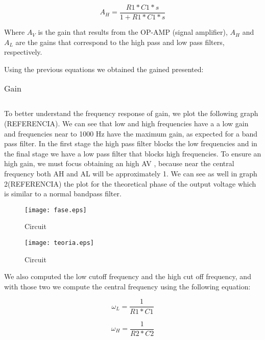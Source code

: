 \begin{equation}
A_{H}=  \frac{R1*C1*s}{1+R1*C1*s}
\end{equation}

Where $A_V$ is the gain that results from the OP-AMP (signal amplifier), $A_H$ and $A_L$ are the gains that correspond to the high pass and low pass filters, respectively.

Using the previous equations we obtained the gained presented:

\begin{table}[H]
\centering
\begin{tabularx}{0.6\textwidth} {
  | >{\raggedright\arraybackslash}X
  | >{\raggedleft\arraybackslash}X | }
 \hline

\end{tabularx}
\caption{Gain}
\end{table}

To better understand the frequency response of gain, we plot the following graph (REFERENCIA).  We can see that low and high frequencies have a a low gain and frequencies near to 1000 Hz have the maximum gain, as expected for a band pass filter.
In the first stage the high pass filter blocks the low frequencies and in the final stage we have a low pass filter that blocks high frequencies. To ensure an high gain, we must focus obtaining an high AV , because near the central frequency both AH and AL will be approximately 1. We can see as well in graph 2(REFERENCIA) the plot for the theoretical phase of the output voltage which is similar to a normal bandpass filter.

\begin{figure}[H] \centering
\texttt{[image: fase.eps]}
\caption{Circuit}
\label{fig:circ}
\end{figure}

\begin{figure}[H] \centering
\texttt{[image: teoria.eps]}
\caption{Circuit}
\label{fig:circ}
\end{figure}
We also computed the low cutoff frequency and the high cut off frequency, and with those two we compute the central frequency using the following equation:

\begin{equation}
\omega_{L}= \frac{1}{R1*C1}
\end{equation}

\begin{equation}
\omega_{H}= \frac{1}{R2*C2}
\end{equation}

